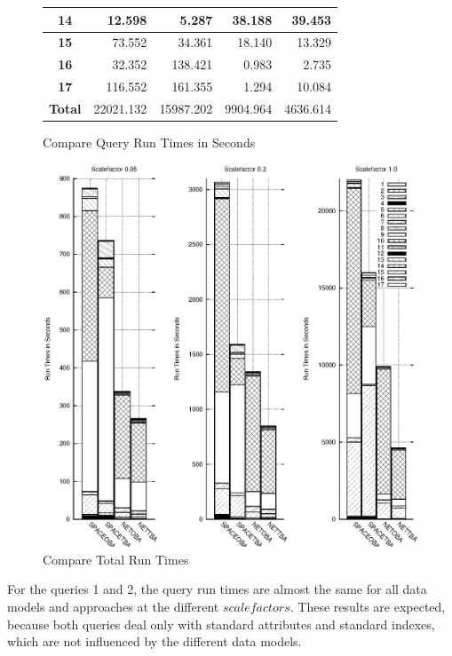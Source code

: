 \documentclass[a4paper]{article}
\begin{document}
\begin{figure}[h]
\begin{minipage}{0.5\linewidth}
\begin{tiny}
\begin{tabular}{|c|r|r|r|r|}
        \hline
        \textbf{14}&12.598&5.287&38.188&39.453\\
        \hline
        \textbf{15}&73.552&34.361&18.140&13.329\\
        \hline
        \textbf{16}&32.352&138.421&0.983&2.735\\
        \hline
        \textbf{17}&116.552&161.355&1.294&10.084\\
        \hline
        \textbf{Total}&22021.132&15987.202&9904.964&4636.614\\
        \hline
      \end{tabular}
    \end{tiny}
  \end{minipage}
 \caption{Compare Query Run Times in Seconds}
 \label{fig:compruntimes}
\end{figure}
\begin{figure}
  \includegraphics[width=1.0\linewidth]{compruntimesall.eps}
  \caption{Compare Total Run Times}
  \label{fig:CompTotalRunTimesGraphic}
\end{figure}

For the queries 1 and 2, the query run times are almost the same for all data models
and approaches at the different $scalefactors$. These results are expected, because
both queries deal only with standard attributes and standard indexes, which
are not influenced by the different data models.
\end{document}
